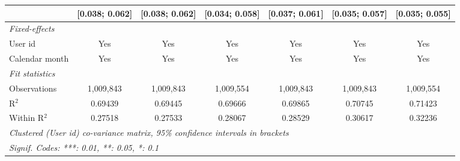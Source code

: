 \begin{table}[htbp]
\begin{threeparttable}[b]
\begin{tabular}{lcccccc}
                                        & [0.038; 0.062]   & [0.038; 0.062]  & [0.034; 0.058]  & [0.037; 0.061]   & [0.035; 0.057]   & [0.035; 0.055]\\   
         \midrule
         \emph{Fixed-effects}\\
         User id                        & Yes              & Yes             & Yes             & Yes              & Yes              & Yes\\  
         Calendar month                 & Yes              & Yes             & Yes             & Yes              & Yes              & Yes\\  
         \midrule
         \emph{Fit statistics}\\
         Observations                   & 1,009,843        & 1,009,843       & 1,009,554       & 1,009,843        & 1,009,843        & 1,009,554\\  
         R$^2$                          & 0.69439          & 0.69445         & 0.69666         & 0.69865          & 0.70745          & 0.71423\\  
         Within R$^2$                   & 0.27518          & 0.27533         & 0.28067         & 0.28529          & 0.30617          & 0.32236\\  
         \midrule \midrule
         \multicolumn{7}{l}{\emph{Clustered (User id) co-variance matrix, 95\% confidence intervals in brackets}}\\
         \multicolumn{7}{l}{\emph{Signif. Codes: ***: 0.01, **: 0.05, *: 0.1}}\\
      \end{tabular}
   \end{threeparttable}
\end{table}


